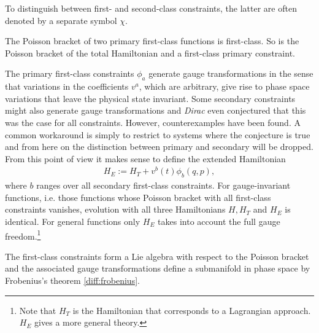     \begin{notation}
        To distinguish between first- and second-class constraints, the latter are often denoted by a separate symbol $\chi$.
    \end{notation}
    \begin{property}[Closure]
        The Poisson bracket of two primary first-class functions is first-class. So is the Poisson bracket of the total Hamiltonian and a first-class primary constraint.
    \end{property}

    \begin{remark}
        The primary first-class constraints $\phi_a$ generate gauge transformations in the sense that variations in the coefficients $v^a$, which are arbitrary, give rise to phase space variations that leave the physical state invariant. Some secondary constraints might also generate gauge transformations and \textit{Dirac} even conjectured that this was the case for all constraints. However, counterexamples have been found. A common workaround is simply to restrict to systems where the conjecture is true and from here on the distinction between primary and secondary will be dropped. From this point of view it makes sense to define the extended Hamiltonian
        \begin{gather}
            H_E := H_T + v^b(t)\phi_b(q,p),
        \end{gather}
        where $b$ ranges over all secondary first-class constraints. For gauge-invariant functions, i.e. those functions whose Poisson bracket with all first-class constraints vanishes, evolution with all three Hamiltonians $H,H_T$ and $H_E$ is identical. For general functions only $H_E$ takes into account the full gauge freedom.\footnote{Note that $H_T$ is the Hamiltonian that corresponds to a Lagrangian approach. $H_E$ gives a more general theory.}
    \end{remark}
    \begin{result}
        The first-class constraints form a Lie algebra with respect to the Poisson bracket and the associated gauge transformations define a submanifold in phase space by Frobenius's theorem \ref{diff:frobenius}.
    \end{result}


